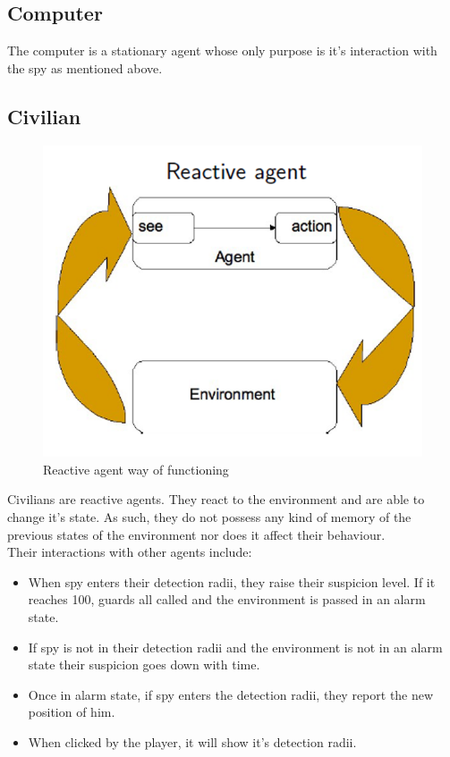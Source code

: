 \documentclass[12pt]{article}
\begin{document}
\subsection{Computer}
The computer is a stationary agent whose only purpose is it's interaction with the spy as mentioned above.
\newpage
\subsection{Civilian}
\begin{figure}[h]
\includegraphics[scale=1]{Picture5.png}
\centering
\caption{Reactive agent way of functioning}
\end{figure}
Civilians are reactive agents. They react to the environment and are able to change it's state. As such, they do not possess any kind of memory of the previous states of the environment nor does it affect their behaviour.\\
Their interactions with other agents include:
\begin{itemize}
\item When spy enters their detection radii, they raise their suspicion level. If it reaches 100, guards all called and the environment is passed in an alarm state.

\item If spy is not in their detection radii and the environment is not in an alarm state their suspicion goes down with time.

\item Once in alarm state, if spy enters the detection radii, they report the new position of him.

\item When clicked by the player, it will show it’s detection radii.
\end{itemize}
\end{document}
